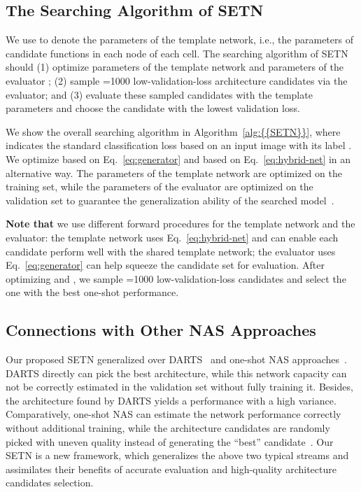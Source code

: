 \documentclass[10pt,twocolumn,letterpaper]{article}
\def\Algref#1{Algorithm~\ref{#1}}
\def\Eqref#1{{Eq.~\eqref{#1}}}
\def\NAME{{SETN}}
\begin{document}
\subsection{The Searching Algorithm of {\NAME}}\label{sec:searching}

We use  to denote the parameters of the template network, i.e., the parameters of candidate functions in each node of each cell.
The searching algorithm of {\NAME} should (1) optimize parameters of the template network  and parameters of the evaluator ; (2) sample =1000 low-validation-loss architecture candidates via the evaluator; and (3) evaluate these sampled candidates with the template parameters  and choose the candidate with the lowest validation loss.

We show the overall searching algorithm in \Algref{alg:{\NAME}}, where  indicates the standard classification loss based on an input image  with its label .
We optimize  based on \Eqref{eq:generator} and  based on \Eqref{eq:hybrid-net} in an alternative way.
The parameters of the template network are optimized on the training set, while the parameters of the evaluator are optimized on the validation set to guarantee the generalization ability of the searched model~\cite{liu2019darts}.

\textbf{Note that} we use different forward procedures for the template network and the evaluator: the template network uses \Eqref{eq:hybrid-net} and can enable each candidate perform well with the shared template network; the evaluator uses \Eqref{eq:generator} can help squeeze the candidate set for evaluation. 
After optimizing  and , we sample =1000 low-validation-loss candidates and select the one with the best one-shot performance.






\subsection{Connections with Other NAS Approaches}\label{sec:discussion}




Our proposed {\NAME} generalized over DARTS~\cite{liu2019darts} and one-shot NAS approaches~\cite{bender2018understanding,brock2018smash}.
DARTS directly can pick the best architecture, while this network capacity can not be correctly estimated in the validation set without fully training it. Besides, the architecture found by DARTS yields a performance with a high variance.
Comparatively, one-shot NAS can estimate the network performance correctly without additional training, while the architecture candidates are randomly picked with uneven quality instead of generating the ``best'' candidate~\cite{bender2018understanding,brock2018smash}.
Our {\NAME} is a new framework, which generalizes the above two typical streams and assimilates their benefits of accurate evaluation and high-quality architecture candidates selection.
\end{document}
